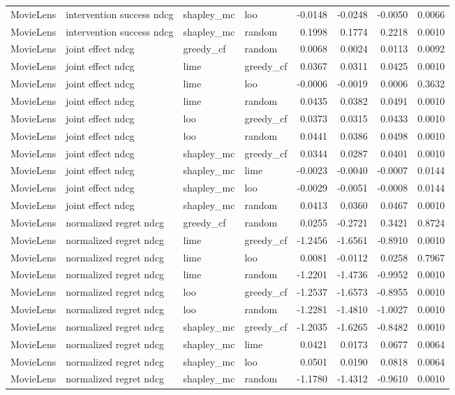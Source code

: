 \begin{longtable}{@{}p{}p{}p{}p{}rrrr@{}}
MovieLens & intervention success ndcg & shapley\_mc & loo & -0.0148 & -0.0248 & -0.0050 & 0.0066 \\
MovieLens & intervention success ndcg & shapley\_mc & random & 0.1998 & 0.1774 & 0.2218 & 0.0010 \\
MovieLens & joint effect ndcg & greedy\_cf & random & 0.0068 & 0.0024 & 0.0113 & 0.0092 \\
MovieLens & joint effect ndcg & lime & greedy\_cf & 0.0367 & 0.0311 & 0.0425 & 0.0010 \\
MovieLens & joint effect ndcg & lime & loo & -0.0006 & -0.0019 & 0.0006 & 0.3632 \\
MovieLens & joint effect ndcg & lime & random & 0.0435 & 0.0382 & 0.0491 & 0.0010 \\
MovieLens & joint effect ndcg & loo & greedy\_cf & 0.0373 & 0.0315 & 0.0433 & 0.0010 \\
MovieLens & joint effect ndcg & loo & random & 0.0441 & 0.0386 & 0.0498 & 0.0010 \\
MovieLens & joint effect ndcg & shapley\_mc & greedy\_cf & 0.0344 & 0.0287 & 0.0401 & 0.0010 \\
MovieLens & joint effect ndcg & shapley\_mc & lime & -0.0023 & -0.0040 & -0.0007 & 0.0144 \\
MovieLens & joint effect ndcg & shapley\_mc & loo & -0.0029 & -0.0051 & -0.0008 & 0.0144 \\
MovieLens & joint effect ndcg & shapley\_mc & random & 0.0413 & 0.0360 & 0.0467 & 0.0010 \\
MovieLens & normalized regret ndcg & greedy\_cf & random & 0.0255 & -0.2721 & 0.3421 & 0.8724 \\
MovieLens & normalized regret ndcg & lime & greedy\_cf & -1.2456 & -1.6561 & -0.8910 & 0.0010 \\
MovieLens & normalized regret ndcg & lime & loo & 0.0081 & -0.0112 & 0.0258 & 0.7967 \\
MovieLens & normalized regret ndcg & lime & random & -1.2201 & -1.4736 & -0.9952 & 0.0010 \\
MovieLens & normalized regret ndcg & loo & greedy\_cf & -1.2537 & -1.6573 & -0.8955 & 0.0010 \\
MovieLens & normalized regret ndcg & loo & random & -1.2281 & -1.4810 & -1.0027 & 0.0010 \\
MovieLens & normalized regret ndcg & shapley\_mc & greedy\_cf & -1.2035 & -1.6265 & -0.8482 & 0.0010 \\
MovieLens & normalized regret ndcg & shapley\_mc & lime & 0.0421 & 0.0173 & 0.0677 & 0.0064 \\
MovieLens & normalized regret ndcg & shapley\_mc & loo & 0.0501 & 0.0190 & 0.0818 & 0.0064 \\
MovieLens & normalized regret ndcg & shapley\_mc & random & -1.1780 & -1.4312 & -0.9610 & 0.0010 \\
\end{longtable}
